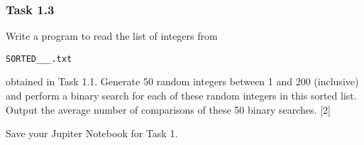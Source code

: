 \subsubsection*{Task 1.3 }

Write a program to read the list of integers from 

\texttt{SORTED\_<your name>\_<centre number>\_<index number>.txt} 

obtained in Task 1.1. Generate 50 random integers between 1 and 200
(inclusive) and perform a binary search for each of these random integers
in this sorted list. Output the average number of comparisons of these
50 binary searches. \hfill{} {[}2{]}

Save your Jupiter Notebook for Task 1.